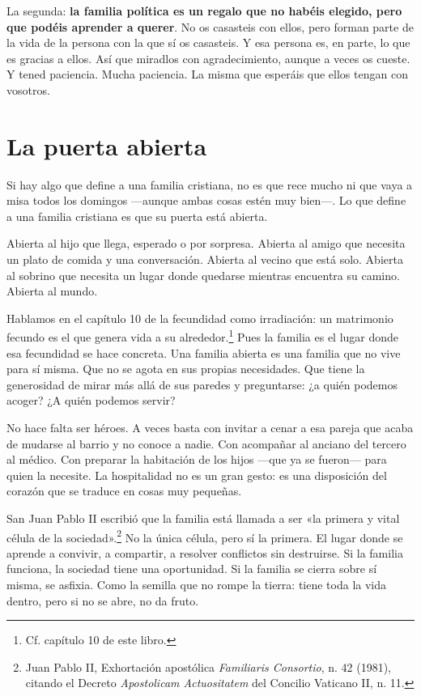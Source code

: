 La segunda: \textbf{la familia política es un regalo que no habéis elegido, pero que podéis aprender a querer}. No os casasteis con ellos, pero forman parte de la vida de la persona con la que sí os casasteis. Y esa persona es, en parte, lo que es gracias a ellos. Así que miradlos con agradecimiento, aunque a veces os cueste. Y tened paciencia. Mucha paciencia. La misma que esperáis que ellos tengan con vosotros.

\section{La puerta abierta}

Si hay algo que define a una familia cristiana, no es que rece mucho ni que vaya a misa todos los domingos ---aunque ambas cosas estén muy bien---. Lo que define a una familia cristiana es que su puerta está abierta.

Abierta al hijo que llega, esperado o por sorpresa. Abierta al amigo que necesita un plato de comida y una conversación. Abierta al vecino que está solo. Abierta al sobrino que necesita un lugar donde quedarse mientras encuentra su camino. Abierta al mundo.

Hablamos en el capítulo 10 de la fecundidad como irradiación: un matrimonio fecundo es el que genera vida a su alrededor.\footnote{Cf. capítulo 10 de este libro.} Pues la familia es el lugar donde esa fecundidad se hace concreta. Una familia abierta es una familia que no vive para sí misma. Que no se agota en sus propias necesidades. Que tiene la generosidad de mirar más allá de sus paredes y preguntarse: ¿a quién podemos acoger? ¿A quién podemos servir?

No hace falta ser héroes. A veces basta con invitar a cenar a esa pareja que acaba de mudarse al barrio y no conoce a nadie. Con acompañar al anciano del tercero al médico. Con preparar la habitación de los hijos ---que ya se fueron--- para quien la necesite. La hospitalidad no es un gran gesto: es una disposición del corazón que se traduce en cosas muy pequeñas.

San Juan Pablo II escribió que la familia está llamada a ser «la primera y vital célula de la sociedad».\footnote{Juan Pablo II, Exhortación apostólica \textit{Familiaris Consortio}, n. 42 (1981), citando el Decreto \textit{Apostolicam Actuositatem} del Concilio Vaticano II, n. 11.} No la única célula, pero sí la primera. El lugar donde se aprende a convivir, a compartir, a resolver conflictos sin destruirse. Si la familia funciona, la sociedad tiene una oportunidad. Si la familia se cierra sobre sí misma, se asfixia. Como la semilla que no rompe la tierra: tiene toda la vida dentro, pero si no se abre, no da fruto.


